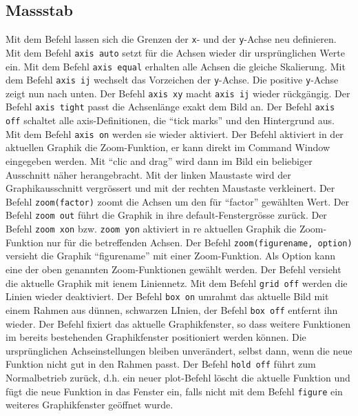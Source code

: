 \subsection{Massstab}
Mit dem Befehl  lassen sich die Grenzen der \texttt{x}- und der \texttt{y}-Achse neu definieren. Mit dem Befehl {\color{red}\texttt{axis auto}} setzt für die Achsen wieder dir ursprünglichen Werte ein. Mit dem Befehl {\color{red}\texttt{axis equal}} erhalten alle Achsen die gleiche Skalierung. Mit dem Befehl {\color{red}\texttt{axis ij}} wechselt das Vorzeichen der \texttt{y}-Achse. Die positive \texttt{y}-Achse zeigt nun nach unten. Der Befehl {\color{red}\texttt{axis xy}} macht {\color{red}\texttt{axis ij}} wieder rückgängig. Der Befehl {\color{red}\texttt{axis tight}} passt die Achsenlänge exakt dem Bild an. Der Befehl {\color{red}\texttt{axis off}} schaltet alle axis-Definitionen, die ``tick marks'' und den Hintergrund aus. Mit dem Befehl {\color{red}\texttt{axis on}} werden sie wieder aktiviert.
\newline\newline
Der Befehl  aktiviert in der aktuellen Graphik die Zoom-Funktion, er kann direkt im Command Window eingegeben werden. Mit ``clic and drag'' wird dann im Bild ein beliebiger Ausschnitt näher herangebracht. Mit der linken Maustaste wird der Graphikausschnitt vergrössert und mit der rechten Maustaste verkleinert. Der Befehl {\color{red}\texttt{zoom(factor)}} zoomt die Achsen um den für ``factor'' gewählten Wert. Der Befehl {\color{red}\texttt{zoom out}} führt die Graphik in ihre default-Fenstergrösse zurück. Der Befehl {\color{red}\texttt{zoom xon}} bzw. {\color{red}\texttt{zoom yon}} aktiviert in re aktuellen Graphik die Zoom-Funktion nur für die betreffenden Achsen. Der Befehl {\color{red}\texttt{zoom(figurename, option)}} versieht die Graphik ``figurename'' mit einer Zoom-Funktion. Als Option kann eine der oben genannten Zoom-Funktionen gewählt werden.
\newline\newline
Der Befehl  versieht die aktuelle Graphik mit ienem Liniennetz. Mit dem Befehl {\color{red}\texttt{grid off}} werden die Linien wieder deaktiviert. Der Befehl {\color{red}\texttt{box on}} umrahmt das aktuelle Bild mit einem Rahmen aus dünnen, schwarzen LInien, der Befehl {\color{red}\texttt{box off}} entfernt ihn wieder.
\newline\newline
Der Befehl  fixiert das aktuelle Graphikfenster, so dass weitere Funktionen im bereits bestehenden Graphikfenster positioniert werden können. Die ursprünglichen Achseinstellungen bleiben unverändert, selbst dann, wenn die neue Funktion nicht gut in den Rahmen passt. Der Befehl {\color{red}\texttt{hold off}} führt zum Normalbetrieb zurück, d.h. ein neuer plot-Befehl löscht die aktuelle Funktion und fügt die neue Funktion in das Fenster ein, falls nicht mit dem Befehl {\color{red}\texttt{figure}} ein weiteres Graphikfenster geöffnet wurde.
